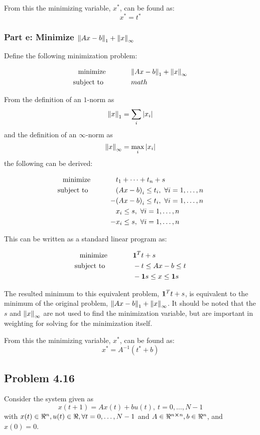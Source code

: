 \documentclass[letter]{article}
\newcommand{\optpblm}[3][eq:default]{
	\begin{equation}\label{#1}
		\begin{aligned}
			\text{minimize} \hspace{0.5in} &#2\vspace{5pt}\\
			\text{subject to \hspace{0.5in}} &#3
		\end{aligned}	
	\end{equation}
}
\begin{document}
From this the minimizing variable, $x^*$, can be found as: $$x^* = t^*$$

\newpage
\subsubsection{Part e: Minimize $\norm{Ax-b}_1 + \norm{x}_\infty$}
Define the following minimization problem:
\optpblm{\norm{Ax-b}_1 + \norm{x}_\infty}{math}
From the definition of an $1$-norm as $$\norm{x}_1 = \sum_i \abs{x_i}$$ and the definition of an $\infty$-norm as $$\norm{x}_\infty = \max_i \abs{x_i}$$ the following can be derived:
\optpblm{t_1 + \cdots + t_n + s}{
		\qty(Ax - b)_i\leq t_i, \ \forall i = 1,\dots,n\\
		-& \qty(Ax - b)_i\leq t_i, \ \forall i = 1,\dots,n\\
		&x_i \leq s, \ \forall i = 1,\dots,n\\
	-	&x_i \leq s, \ \forall i = 1,\dots,n}
This can be written as a standard linear program as:
\optpblm{\vb{1}^T t + s}{
		- t \leq Ax-b \leq t\\
		&-\vb{1}s \leq x \leq \vb{1}s}
The resulted minimum to this equivalent problem, $\vb{1}^T t + s$, is equivalent to the minimum of the original problem, $\norm{Ax-b}_1 + \norm{x}_\infty$. It should be noted that the $s$ and $\norm{x}_\infty$ are not used to find the minimization variable, but are important in weighting for solving for the minimization itself.

From this the minimizing variable, $x^*$, can be found as: $$x^* = A^{-1} (t^* + b)$$

\newpage
\subsection{Problem 4.16}
Consider the system given as
\begin{equation}\label{eq:dyn_sys_def}
	x(t+1) = A x(t) + b u(t), \ t = 0,\dots,N-1
\end{equation}
with $x(t) \in \real^n, u(t) \in \real, \forall t = 0,\dots,N-1$ and $A \in \real^{n\cross n}, b \in \real^n$, and $x(0) = 0$.\\
\end{document}
